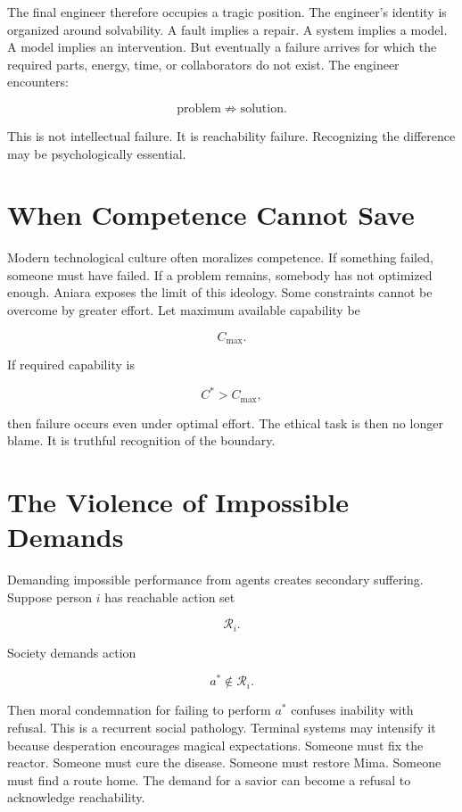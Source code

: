 \documentclass[11pt,oneside]{book}
\theoremstyle{definition}
\theoremstyle{remark}
\newcommand{\R}{\mathcal{R}}
\begin{document}
The final engineer therefore occupies a tragic position. The engineer's identity is organized around
solvability. A fault implies a repair. A system implies a model. A model implies an intervention.
But eventually a failure arrives for which the required parts, energy, time, or collaborators do not
exist. The engineer encounters:

\[
\text{problem} \not\Rightarrow \text{solution}.
\]

This is not intellectual failure. It is reachability failure. Recognizing the difference may be
psychologically essential.

\section{When Competence Cannot Save}

Modern technological culture often moralizes competence. If something failed, someone must have
failed. If a problem remains, somebody has not optimized enough. Aniara exposes the limit of this
ideology. Some constraints cannot be overcome by greater effort. Let maximum available capability be

\[
C_{\max}.
\]

If required capability is

\[
C^\ast>C_{\max},
\]

then failure occurs even under optimal effort. The ethical task is then no longer blame. It is
truthful recognition of the boundary.

\section{The Violence of Impossible Demands}

Demanding impossible performance from agents creates secondary suffering. Suppose person \(i\) has
reachable action set

\[
\R_i.
\]

Society demands action

\[
a^\ast\notin\R_i.
\]

Then moral condemnation for failing to perform \(a^\ast\) confuses inability with refusal. This is a
recurrent social pathology. Terminal systems may intensify it because desperation encourages magical
expectations. Someone must fix the reactor. Someone must cure the disease. Someone must restore
Mima. Someone must find a route home. The demand for a savior can become a refusal to acknowledge
reachability.
\end{document}
